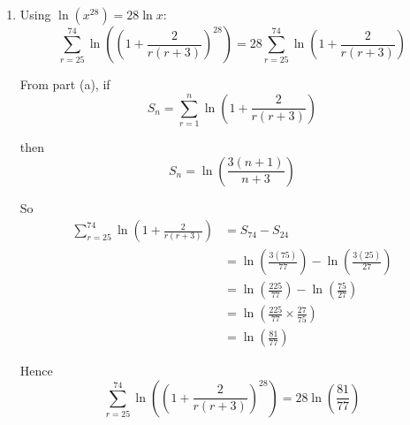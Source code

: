 \documentclass[leqno]{article}
\begin{document}
\begin{enumerate}[
  label=\textbf{\arabic*.},
  leftmargin=*,
  topsep=0pt,
  partopsep=0pt,
  parsep=0pt
]
\begin{djsSolution}
\begin{enumerate}[label=\textbf{(\alph*)}]
For the first sum:
\begin{align*}
\sum_{r=1}^{n}\bigl(\ln(r+1)-\ln r\bigr)
&=\bigl(\cxl{blue}{\ln2}+\cxl{red}{\ln3}+\cxl{teal}{\ln4}+\cdots+\cxl{violet}{\ln n}+\ln(n+1)\bigr)\\
&\qquad-\bigl(\ln1+\cxl{blue}{\ln2}+\cxl{red}{\ln3}+\cxl{teal}{\ln4}+\cdots+\cxl{violet}{\ln n}\bigr)\\
&=\ln(n+1)-\ln1
\end{align*}

For the second sum:
\begin{align*}
\sum_{r=1}^{n}\bigl(\ln(r+2)-\ln(r+3)\bigr)
&=\bigl(\ln3+\cxl{blue}{\ln4}+\cxl{red}{\ln5}+\cdots+\cxl{violet}{\ln(n+2)}\bigr)\\
&\qquad-\bigl(\cxl{blue}{\ln4}+\cxl{red}{\ln5}+\cdots+\cxl{violet}{\ln(n+2)}+\ln(n+3)\bigr)\\
&=\ln3-\ln(n+3)
\end{align*}

Therefore
\begin{align*}
S_n
&=\bigl(\ln(n+1)-\ln1\bigr)+\bigl(\ln3-\ln(n+3)\bigr)\\
&=\ln(n+1)+\ln3-\ln(n+3)
\end{align*}

Combining the logarithms:
\[
S_n=\ln\left(\frac{3(n+1)}{n+3}\right)
\]

So
\[
\sum_{r=1}^{n}\ln\left(1+\frac{2}{r(r+3)}\right)=\ln\left(\frac{3(n+1)}{n+3}\right)
\]

  \item Using \(\ln\left(x^{28}\right)=28\ln x\):
\[
\sum_{r=25}^{74}\ln\left(\left(1+\frac{2}{r(r+3)}\right)^{28}\right)=28\sum_{r=25}^{74}\ln\left(1+\frac{2}{r(r+3)}\right)
\]

From part (a), if
\[
S_n=\sum_{r=1}^{n}\ln\left(1+\frac{2}{r(r+3)}\right)
\]

then
\[
S_n=\ln\left(\frac{3(n+1)}{n+3}\right)
\]

So
\begin{align*}
\sum_{r=25}^{74}\ln\left(1+\frac{2}{r(r+3)}\right)
&=S_{74}-S_{24}\\
&=\ln\left(\frac{3(75)}{77}\right)-\ln\left(\frac{3(25)}{27}\right)\\
&=\ln\left(\frac{225}{77}\right)-\ln\left(\frac{75}{27}\right)\\
&=\ln\left(\frac{225}{77}\times\frac{27}{75}\right)\\
&=\ln\left(\frac{81}{77}\right)
\end{align*}

Hence
\[
\sum_{r=25}^{74}\ln\left(\left(1+\frac{2}{r(r+3)}\right)^{28}\right)=28\ln\left(\frac{81}{77}\right)
\]


\end{enumerate}
\end{djsSolution}
\end{enumerate}
\end{document}
